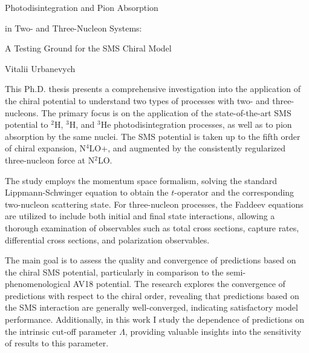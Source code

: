 \documentclass[a4paper, 14pt]{extarticle}
\begin{document}

\Large
 \begin{center}
    Photodisintegration and Pion Absorption
    
    in Two- and Three-Nucleon Systems:
    
    A Testing Ground for the SMS Chiral Model

\hspace{10pt}

\large
Vitalii Urbanevych \\

\hspace{10pt}


\end{center}

\hspace{10pt}

\normalsize

This Ph.D. thesis presents a comprehensive investigation into the application of the chiral potential to understand two types of processes with two- and three-nucleons.
The primary focus is on the application of 
the state-of-the-art SMS potential to $^2$H, $^3$H, and $^3$He photodisintegration processes,
as well as to pion absorption by the same nuclei.
The SMS potential is taken up to the fifth order of chiral expansion, N$^4$LO+, and augmented by the consistently regularized three-nucleon force at N$^2$LO.

The study employs the momentum space formalism, solving the standard Lippmann-Schwinger equation to obtain the $t$-operator and the corresponding two-nucleon scattering state. For three-nucleon processes, the Faddeev equations are utilized to include both initial and final state interactions, allowing a thorough examination of observables such as total cross sections, capture rates, differential cross sections, and polarization observables.

The main goal is to assess the quality and convergence of predictions based on the chiral SMS potential, particularly in comparison to the semi-phenomenological AV18 potential. The research explores the convergence of predictions with respect to the chiral order, revealing that predictions based on the SMS interaction are generally well-converged, indicating satisfactory model performance. Additionally, in this work I study the dependence of predictions on the intrinsic cut-off parameter $\Lambda$, providing valuable insights into the sensitivity of results to this parameter.
\end{document}
